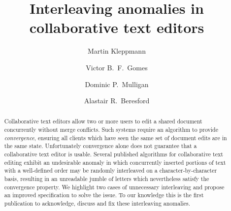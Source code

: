 \documentclass[sigconf]{acmart}
\begin{document}
\title{Interleaving anomalies in collaborative text editors}

\author{Martin Kleppmann}

\author{Victor B.\ F.\ Gomes}

\author{Dominic P.\ Mulligan}

\author{Alastair R.\ Beresford}

\begin{abstract}
Collaborative text editors allow two or more users to edit a shared document concurrently without merge conflicts.
Such systems require an algorithm to provide \emph{convergence}, ensuring all clients which have seen the same set of document edits are in the same state.
Unfortunately convergence alone does not guarantee that a collaborative text editor is usable.
Several published algorithms for collaborative text editing exhibit an undesirable anomaly in which concurrently inserted portions of text with a well-defined order may be randomly interleaved on a character-by-character basis, resulting in an unreadable jumble of letters which nevertheless satisfy the convergence property.
We highlight two cases of unnecessary interleaving and propose an improved specification to solve the issue.
To our knowledge this is the first publication to acknowledge, discuss and fix these interleaving anomalies.
\end{abstract}
\end{document}
